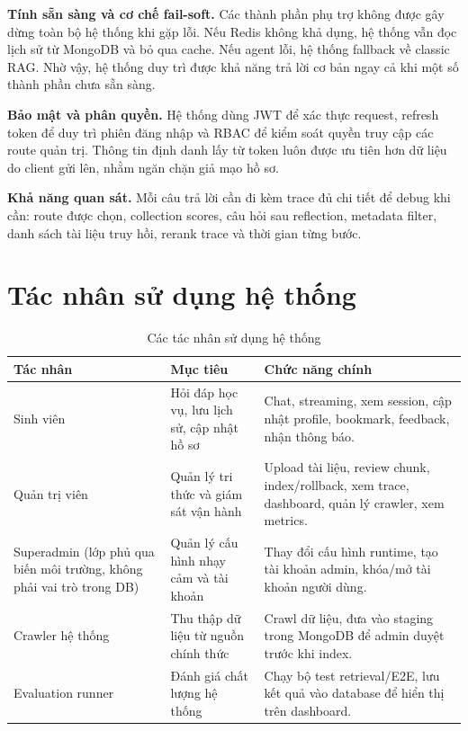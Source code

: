 \documentclass[../DoAn.tex]{subfiles}
\begin{document}
\textbf{Tính sẵn sàng và cơ chế fail-soft.} Các thành phần phụ trợ không
được gây dừng toàn bộ hệ thống khi gặp lỗi. Nếu Redis không khả dụng, hệ
thống vẫn đọc lịch sử từ MongoDB và bỏ qua cache. Nếu agent lỗi, hệ thống
fallback về classic RAG. Nhờ vậy, hệ thống duy trì được khả năng trả lời cơ
bản ngay cả khi một số thành phần chưa sẵn sàng.

\textbf{Bảo mật và phân quyền.} Hệ thống dùng JWT để xác thực request,
refresh token để duy trì phiên đăng nhập và RBAC để kiểm soát quyền truy cập
các route quản trị. Thông tin định danh lấy từ token luôn được ưu tiên hơn
dữ liệu do client gửi lên, nhằm ngăn chặn giả mạo hồ sơ.

\textbf{Khả năng quan sát.} Mỗi câu trả lời cần đi kèm trace đủ chi tiết
để debug khi cần: route được chọn, collection scores, câu hỏi sau reflection,
metadata filter, danh sách tài liệu truy hồi, rerank trace và thời gian từng
bước.

\section{Tác nhân sử dụng hệ thống}

\begin{table}[H]
\centering
\small
\begin{tabular}{|p{3.0cm}|p{4.8cm}|p{5.8cm}|}
\hline
\textbf{Tác nhân} & \textbf{Mục tiêu} & \textbf{Chức năng chính} \\
\hline
Sinh viên & Hỏi đáp học vụ, lưu lịch sử, cập nhật hồ sơ & Chat, streaming, xem
session, cập nhật profile, bookmark, feedback, nhận thông báo. \\
\hline
Quản trị viên & Quản lý tri thức và giám sát vận hành & Upload tài liệu, review
chunk, index/rollback, xem trace, dashboard, quản lý crawler, xem metrics. \\
\hline
Superadmin (lớp phủ qua biến môi trường, không phải vai trò trong DB) & Quản lý
cấu hình nhạy cảm và tài khoản & Thay đổi cấu hình runtime, tạo tài khoản admin,
khóa/mở tài khoản người dùng. \\
\hline
Crawler hệ thống & Thu thập dữ liệu từ nguồn chính thức & Crawl dữ liệu, đưa
vào staging trong MongoDB để admin duyệt trước khi index. \\
\hline
Evaluation runner & Đánh giá chất lượng hệ thống & Chạy bộ test retrieval/E2E,
lưu kết quả vào database để hiển thị trên dashboard. \\
\hline
\end{tabular}
\caption{Các tác nhân sử dụng hệ thống}
\end{table}
\end{document}
